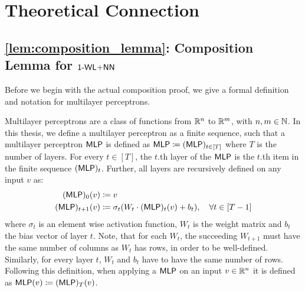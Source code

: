 \section{Theoretical Connection}

\subsection{\cref{lem:composition_lemma}: Composition Lemma for $\text{\textsf{1-WL+NN}}$}\label{app:composition_proof}
Before we begin with the actual composition proof, we give a formal definition and notation for multilayer perceptrons.

\begin{definition}\label{def:mlp}
    Multilayer perceptrons are a class of functions from $\mathbb{R}^n$ to $\mathbb{R}^m$, with $n,m \in \mathbb{N}$. In this thesis, we define a multilayer perceptron as a finite sequence, such that a multilayer perceptron $\textsf{MLP}$ is defined as $\textsf{MLP} \coloneqq (\textsf{MLP})_{t\in[T]}$ where $T$ is the number of layers. For every $t \in [T]$, the $t$.th layer of the $\textsf{MLP}$ is the $t$.th item in the finite sequence $(\textsf{MLP})_t$. Further, all layers are recursively defined on any input $v$ as:
    \begin{align*}
        (\textsf{MLP})_{0}(v) &\coloneqq v\\
        (\textsf{MLP})_{t+1}(v) &\coloneqq \sigma_t(W_t \cdot (\textsf{MLP})_{t} (v) + b_t), \quad \forall t \in [T-1]
    \end{align*}
    where $\sigma_t$ is an element wise activation function, $W_t$ is the weight matrix and $b_t$ the bias vector of layer $t$. Note, that for each $W_t$, the succeeding $W_{t+1}$ must have the same number of columns as $W_t$ has rows, in order to be well-defined. Similarly, for every layer $t$, $W_t$ and $b_t$ have to have the same number of rows.
    Following this definition, when applying a $\textsf{MLP}$ on an input $v \in \mathbb{R}^n$ it is defined as $\textsf{MLP}(v) \coloneqq (\textsf{MLP})_T(v)$.
\end{definition}

